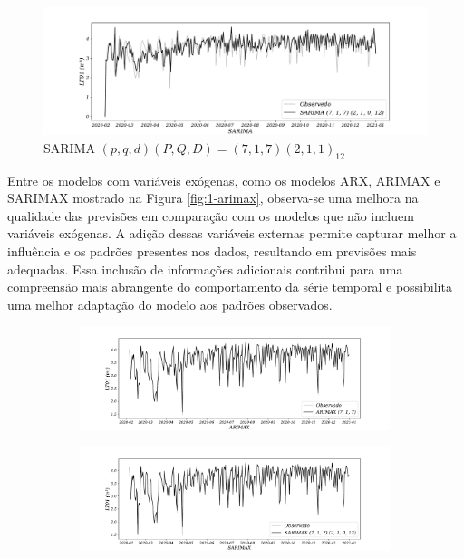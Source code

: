 \begin{figure}[H]
	\centering
	\caption{SARIMA $ (p,q,d)(P,Q,D)=(7,1,7) (2,1,1)_{12}$}
	\label{fig:1-sarima}
	\includegraphics[width=1\linewidth]{Modelos/Figuras/SARIMA}
	
	
\end{figure}

Entre os modelos com variáveis exógenas, como os modelos ARX, ARIMAX e SARIMAX mostrado na Figura \ref{fig:1-arimax}, observa-se uma melhora na qualidade das previsões em comparação com os modelos que não incluem variáveis exógenas. A adição dessas variáveis externas permite capturar melhor a influência e os padrões presentes nos dados, resultando em previsões mais adequadas. Essa inclusão de informações adicionais contribui para uma compreensão mais abrangente do comportamento da série temporal e possibilita uma melhor adaptação do modelo aos padrões observados.

\begin{figure}[H]
	\centering
	\caption{Comparação entre ARIMAX e SARIMAX \label{fig:1-arimax}\label{fig:1-sarimax}}
	\begin{subfigure}{1\textwidth}
		\includegraphics[width=\linewidth]{Modelos/Figuras/ARIMAX}
		
		
	\end{subfigure}
	\hfill
	
	\begin{subfigure}{1\textwidth}
		\includegraphics[width=\linewidth]{Modelos/Figuras/SARIMAX}
		
			
	\end{subfigure}
	
	
\end{figure}

